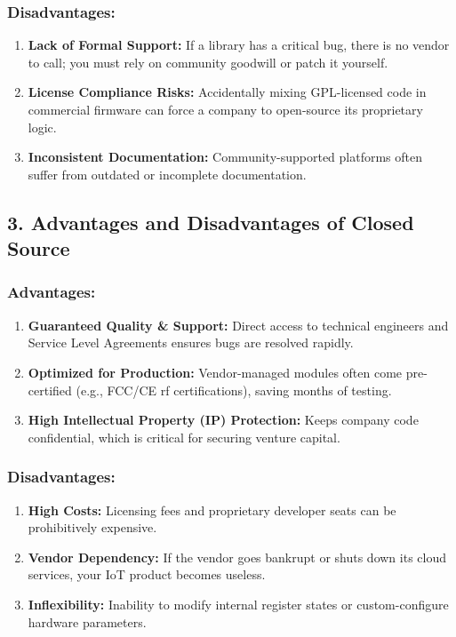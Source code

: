 \subsubsection{Disadvantages:}
\begin{enumerate}
  \item \textbf{Lack of Formal Support:} If a library has a critical bug, there is no vendor to call; you must rely on community goodwill or patch it yourself.
  \item \textbf{License Compliance Risks:} Accidentally mixing GPL-licensed code in commercial firmware can force a company to open-source its proprietary logic.
  \item \textbf{Inconsistent Documentation:} Community-supported platforms often suffer from outdated or incomplete documentation.
\end{enumerate}


\subsection{3. Advantages and Disadvantages of Closed Source}

\subsubsection{Advantages:}
\begin{enumerate}
  \item \textbf{Guaranteed Quality \& Support:} Direct access to technical engineers and Service Level Agreements ensures bugs are resolved rapidly.
  \item \textbf{Optimized for Production:} Vendor-managed modules often come pre-certified (e.g., FCC/CE rf certifications), saving months of testing.
  \item \textbf{High Intellectual Property (IP) Protection:} Keeps company code confidential, which is critical for securing venture capital.
\end{enumerate}

\subsubsection{Disadvantages:}
\begin{enumerate}
  \item \textbf{High Costs:} Licensing fees and proprietary developer seats can be prohibitively expensive.
  \item \textbf{Vendor Dependency:} If the vendor goes bankrupt or shuts down its cloud services, your IoT product becomes useless.
  \item \textbf{Inflexibility:} Inability to modify internal register states or custom-configure hardware parameters.
\end{enumerate}



